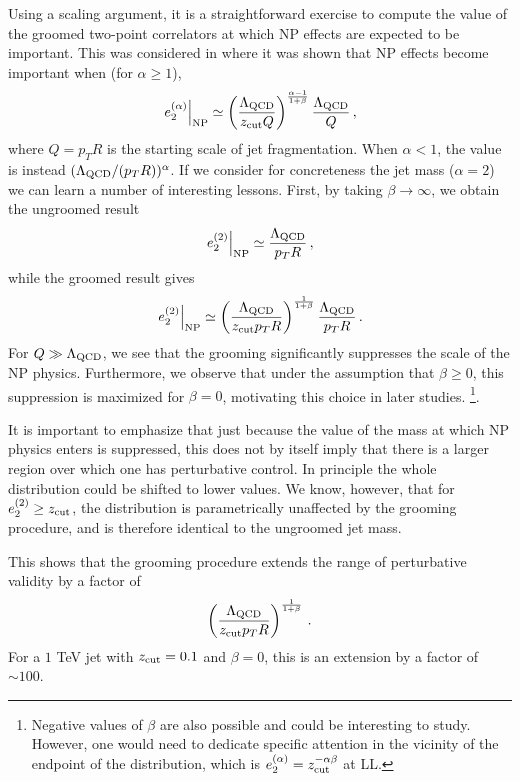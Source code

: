 Using a scaling argument, it is a straightforward exercise to compute the value of the groomed two-point correlators at which NP effects are expected to be important.
%
This was considered in  where it was shown that NP effects become important when (for $\alpha \geq 1$),
%
\begin{align}
\label{eq:np}
\left. e_{2}^{(\alpha)} \right |_{\text{NP}} \simeq  \left( \frac{{\Lambda_\text{QCD}}}{z_{\rm cut} Q}  \right)^{\frac{\alpha-1}{1+\beta}}  \frac{{\Lambda_\text{QCD}}}{Q}\,,
\end{align}
%
where $Q=p_TR$ is the starting scale of jet fragmentation.
%
When $\alpha< 1$, the value is instead $({\Lambda_\text{QCD}}/(p_TR))^\alpha$.
%
If we consider for concreteness the jet mass ($\alpha=2$) we can learn a number of interesting lessons.
%
First, by taking $\beta\to \infty$, we obtain the ungroomed result
%
\begin{align}
\left. e_{2}^{(2)} \right |_{\text{NP}} \simeq  \frac{{\Lambda_\text{QCD}}}{p_TR}\,,
\end{align} 
%
while the groomed result gives 
%
\begin{align}
\left. e_{2}^{(2)} \right |_{\text{NP}} \simeq  \left( \frac{{\Lambda_\text{QCD}}}{z_{\rm cut} p_TR}  \right)^{\frac{1}{1+\beta}}  \frac{{\Lambda_\text{QCD}}}{p_TR}\,.
\end{align}
%
For $Q\gg {\Lambda_\text{QCD}}$, we see that the grooming significantly suppresses the scale of the NP physics.
%
Furthermore, we observe that under the assumption that $\beta \geq 0$, this suppression is maximized for $\beta=0$, motivating this choice in later studies.%
\footnote{Negative values of $\beta$ are also possible and could be interesting to study.  However, one would need to dedicate specific attention in the vicinity of the endpoint of the distribution, which is $e_{2}^{(\alpha)}=z_\text{cut}^{-\alpha\beta}$ at LL.}. 

It is important to emphasize that just because the value of the mass at which NP physics enters is suppressed, this does not by itself imply that there is a larger region over which one has perturbative control.
%
In principle the whole distribution could be shifted to lower values.
%
We know, however, that for $e_{2}^{(2)} \geq z_{\rm cut}$, the distribution is parametrically unaffected by the grooming procedure, and is therefore identical to the ungroomed jet mass. 

This shows that the grooming procedure extends the range of perturbative validity by a factor of
%
\begin{align}
\left( \frac{{\Lambda_\text{QCD}}}{z_{\rm cut} p_TR}  \right)^{\frac{1}{1+\beta}} \,.
\end{align}
%
For a $1$ TeV jet with $z_{\rm cut} =0.1$ and $\beta=0$, this is an extension by a factor of $\sim 100$.

